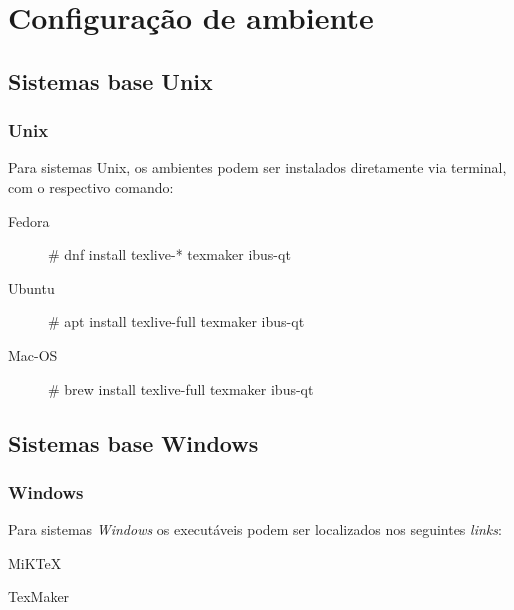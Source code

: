 \section{Configuração de ambiente} %
\label{sec:configura_o_de_ambiente}

\subsection{Sistemas base Unix} %
\label{sub:sistemas_base_unix}

\begin{frame}[fragile]
	\frametitle{Unix}

	Para sistemas Unix, os ambientes podem ser instalados diretamente via terminal, com o respectivo comando:

	\begin{description}
		\item [Fedora] {\code \# dnf install texlive-* texmaker ibus-qt}
		\item [Ubuntu] {\code \# apt install texlive-full texmaker ibus-qt}
		\item [Mac-OS] {\code \# brew install texlive-full texmaker ibus-qt}
	\end{description}

\end{frame}

\subsection{Sistemas base Windows} %
\begin{frame}[fragile]
	\frametitle{Windows}

	Para sistemas {\it Windows} os executáveis podem ser localizados nos seguintes {\it links}:

	\begin{description}
		\item [MiKTeX] \href{http://ctan.sharelatex.com/tex-archive/systems/win32/miktex/}{ }
		\item [TexMaker] \href{http://www.xm1math.net/texmaker/download.html#windows}{ }
	\end{description}

\end{frame}

